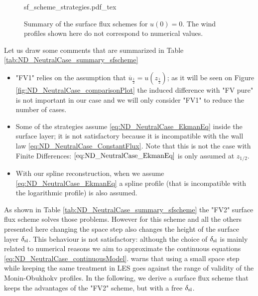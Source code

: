 \begin{figure}
	\centering
	{sf_scheme_strategies.pdf_tex}
	\caption{Summary of the surface flux schemes for $u(0)=0$.
	The wind profiles shown here do not correspond to
	numerical values.}
	\label{fig:ND_NeutralCase_summary_sfscheme}
\end{figure}
Let us draw some comments that are summarized in Table
\ref{tab:ND_NeutralCase_summary_sfscheme}
\begin{itemize}
	\item "FV1" relies on the assumption that
		$\overline{u}_{\frac{1}{2}} = u(z_{\frac{1}{2}})$;
		as it will be seen on Figure
		\ref{fig:ND_NeutralCase_comparisonPlot} the
		induced difference with "FV pure" is not important
		in our case and we will only consider "FV1" to
		reduce the number of cases.
	\item Some of the strategies assume
		\eqref{eq:ND_NeutralCase_EkmanEq} inside the surface
		layer; it is not satisfactory because it is
		incompatible with the wall law
		\eqref{eq:ND_NeutralCase_ConstantFlux}.
		Note that this is not
		the case with Finite Differences:
		$\eqref{eq:ND_NeutralCase_EkmanEq}$ is only assumed
		at $z_{1/2}$.
	\item With our spline reconstruction, when we assume
		\eqref{eq:ND_NeutralCase_EkmanEq} a spline
		profile (that is incompatible
		with the logarithmic profile) is also assumed.
\end{itemize}
As shown in Table \ref{tab:ND_NeutralCase_summary_sfscheme}
the "FV2" surface flux scheme solves those problems.
However for this scheme and all the others presented here
changing the space step
also changes the height of the surface layer $\delta_{\rm sl}$.
This behaviour is not satisfactory: although
the choice of $\delta_{\rm sl}$ is mainly related to numerical
reasons we aim to approximate the continuous equations
\eqref{eq:ND_NeutralCase_continuousModel}.
\cite{basu_cautionary_2017} warns that using a small space step
while keeping the same treatment in LES goes against the
range of validity of the Monin-Obukhokv profiles.
In the following, we derive a surface flux scheme that keeps
the advantages of the "FV2" scheme, but with a free $\delta_{\rm sl}$.
%
